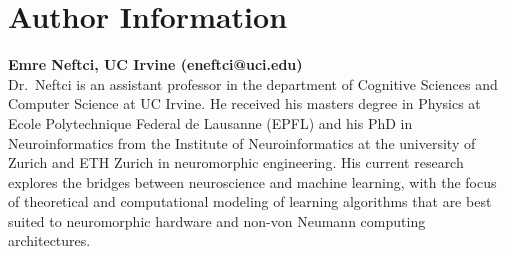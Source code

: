 \documentclass[journal,onecolumn,11pt]{IEEEtran}
\begin{document}
%













\section{Author Information}
\textbf{Emre Neftci, UC Irvine (eneftci@uci.edu)}\\
Dr.~Neftci is an assistant professor in the department of Cognitive Sciences and Computer Science at UC Irvine. He received his masters degree in Physics at Ecole Polytechnique Federal de Lausanne (EPFL) and his PhD in Neuroinformatics from the Institute of Neuroinformatics at the university of Zurich and ETH Zurich in neuromorphic engineering. His current research explores the bridges between neuroscience and machine learning, with the focus of theoretical and computational modeling of learning algorithms that are best suited to neuromorphic hardware and non-von Neumann computing architectures.\\
\end{document}
